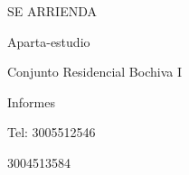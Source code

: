 \documentclass[final]{beamer}
\date{Jul. 31th, 2007}
\begin{document}
  \begin{frame}{}
\centering
  \begin{block}
  \centering
      {\VERYHuge \begin{center}
      SE ARRIENDA
      \end{center}}\par
      {\large \begin{center}
      Aparta-estudio
      \end{center}}\par
      {\large \begin{center}
      Conjunto Residencial Bochiva I
      \end{center}}\par
      {\Large \begin{center}
      Informes
      \end{center}}\par
      {\large \begin{center}
      Tel: 3005512546
      \end{center}}\par
      {\large \begin{center}
      \hspace*{48pt} 3004513584
      \end{center}}\par  
  \end{block}
  \end{frame}
\end{document}
